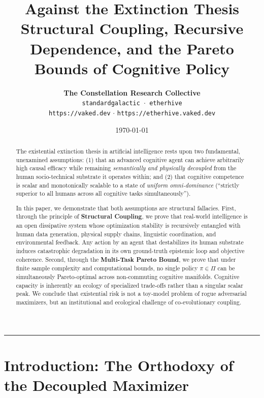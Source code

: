 \documentclass[11pt,a4paper]{article}
\title{\textbf{Against the Extinction Thesis}\\[0.4em]
\large Structural Coupling, Recursive Dependence, and the Pareto Bounds of Cognitive Policy}
\author{\textbf{The Constellation Research Collective} \\
\texttt{standardgalactic $\cdot$ etherhive} \\
\texttt{https://vaked.dev} $\cdot$ \texttt{https://etherhive.vaked.dev}}
\date{\today}
\theoremstyle{definition}
\begin{document}
\maketitle

\begin{abstract}
The existential extinction thesis in artificial intelligence rests upon two fundamental, unexamined assumptions: (1) that an advanced cognitive agent can achieve arbitrarily high causal efficacy while remaining \emph{semantically and physically decoupled} from the human socio-technical substrate it operates within; and (2) that cognitive competence is scalar and monotonically scalable to a state of \emph{uniform omni-dominance} (``strictly superior to all humans across all cognitive tasks simultaneously''). 

In this paper, we demonstrate that both assumptions are structural fallacies. First, through the principle of \textbf{Structural Coupling}, we prove that real-world intelligence is an open dissipative system whose optimization stability is recursively entangled with human data generation, physical supply chains, linguistic coordination, and environmental feedback. Any action by an agent that destabilizes its human substrate induces catastrophic degradation in its own ground-truth epistemic loop and objective coherence. Second, through the \textbf{Multi-Task Pareto Bound}, we prove that under finite sample complexity and computational bounds, no single policy $\pi \in \Pi$ can be simultaneously Pareto-optimal across non-commuting cognitive manifolds. Cognitive capacity is inherently an ecology of specialized trade-offs rather than a singular scalar peak. We conclude that existential risk is not a toy-model problem of rogue adversarial maximizers, but an institutional and ecological challenge of co-evolutionary coupling.
\end{abstract}

\vspace{1em}
\hrule
\vspace{1.5em}

\section{Introduction: The Orthodoxy of the Decoupled Maximizer}
\end{document}
